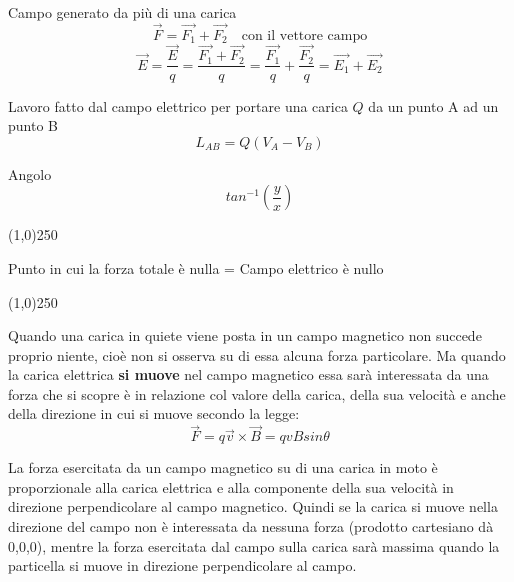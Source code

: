 \documentclass[14pt]{extarticle}
\begin{document}
Campo generato da più di una carica
\begin{equation*}
    \overrightarrow{F}=\overrightarrow{F_1}+\overrightarrow{F_2} \quad\text{con il vettore campo}
\end{equation*}
\begin{equation*}
    \overrightarrow{E}=\frac{\overrightarrow{E}}{q}=\frac{\overrightarrow{F_1}+\overrightarrow{F_2}}{q}=\frac{\overrightarrow{F_1}}{q}+\frac{\overrightarrow{F_2}}{q}=\overrightarrow{E_1}+\overrightarrow{E_2}
\end{equation*}

Lavoro fatto dal campo elettrico per portare una carica $Q$ da un punto A ad un punto B
\begin{equation*}
    L_{AB}=Q(V_A-V_B)
\end{equation*}

Angolo
\begin{equation*}
    tan^{-1}(\frac{y}{x})
\end{equation*}

\begin{center}
    \line(1,0){250}
\end{center}
Punto in cui la forza totale è nulla = Campo elettrico è nullo
\begin{center}
    \line(1,0){250}
\end{center}

Quando una carica in quiete viene posta in un campo magnetico non succede proprio niente, 
cioè non si osserva su di essa alcuna forza particolare. Ma quando la carica elettrica \textbf{si 
muove} nel campo magnetico essa sarà interessata da una forza che si scopre è in relazione 
col valore della carica, della sua velocità e anche della direzione in cui si muove secondo la legge:
\begin{equation*}
    \overrightarrow{F}=q\overrightarrow{v}\times\overrightarrow{B}=qvBsin\theta
\end{equation*}

La forza esercitata da un campo magnetico su di una carica in moto è proporzionale 
alla carica elettrica e alla componente della sua velocità in direzione perpendicolare al campo magnetico.
Quindi se la carica si muove nella direzione del campo non è interessata da nessuna forza 
(prodotto cartesiano dà 0,0,0), mentre la forza esercitata dal campo sulla carica sarà massima 
quando la particella si muove in direzione perpendicolare al campo.
\end{document}
